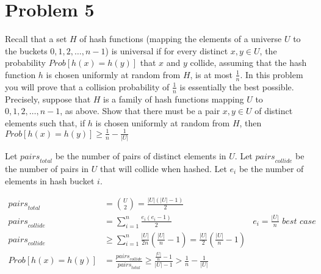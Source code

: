 \documentclass[10pt]{article}
\begin{document}
\section*{\normalsize Problem 5}

Recall that a set $H$ of hash functions (mapping the elements of a universe $U$ to the buckets ${0,1,2,\dots,n-1}$) is universal if for every distinct $x,y \in U$, the probability $Prob[h(x) = h(y)]$ that $x$ and $y$ collide, assuming that the hash function $h$ is chosen uniformly at random from $H$, is at most $\frac{1}{n}$. In this problem you will prove that a collision probability of $\frac{1}{n}$ is essentially the best possible. Precisely, suppose that $H$ is a family of hash functions mapping $U$ to ${0,1,2,\dots,n-1}$, as above. Show that there must be a pair $x,y \in U$ of distinct elements such that, if $h$ is chosen uniformly at random from $H$, then $Prob[h(x) = h(y)] \geq \frac{1}{n} - \frac{1}{|U|}$
\bigskip

Let ${pairs}_{total}$ be the number of pairs of distinct elements in $U$. Let ${pairs}_{collide}$ be the number of pairs in $U$ that will collide when hashed. Let $e_i$ be the number of elements in hash bucket $i$.

\begin{align*}
  {pairs}_{total} &= \binom{U}{2} = \frac{|U|(|U| - 1)}{2} \\
  {pairs}_{collide} &= \sum_{i=1}^{n} \frac{e_i(e_i - 1)}{2} &e_i = \frac{|U|}{n}\textit{ best case} \\
  {pairs}_{collide} &\geq \sum_{i=1}^{n} \frac{|U|}{2n} \left(\frac{|U|}{n} - 1 \right) = \frac{|U|}{2} \left(\frac{|U|}{n} - 1 \right) \\
  Prob[h(x) = h(y)] &= \frac{{pairs}_{collide}}{{pairs}_{total}} \geq \frac{\frac{|U|}{n} - 1}{|U| - 1} > \frac{1}{n} - \frac{1}{|U|}
\end{align*}
\end{document}
